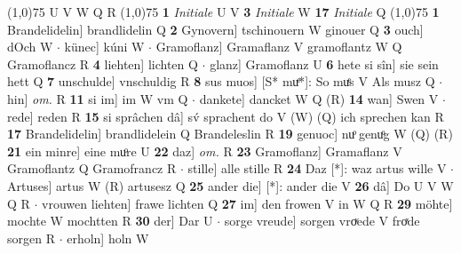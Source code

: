 \documentclass[8pt,a4paper,notitlepage]{article}
\begin{document}
\begin{table}[ht]
\begin{minipage}[t]{0.5\linewidth}
\begin{tabular}{rl}
\end{tabular}
\scriptsize
\line(1,0){75} \newline
U V W Q R \newline
\line(1,0){75} \newline
\textbf{1} \textit{Initiale} U V  \textbf{3} \textit{Initiale} W  \textbf{17} \textit{Initiale} Q  \newline
\line(1,0){75} \newline
\textbf{1} Brandelidelin] brandlidelin Q \textbf{2} Gynovern] tschinouern W ginouer Q \textbf{3} ouch] dOch W  $\cdot$ künec] kúni W  $\cdot$ Gramoflanz] Gramaflanz V gramoflantz W Q Gramoflancz R \textbf{4} liehten] lichten Q  $\cdot$ glanz] Gramoflanz U \textbf{6} hete si sîn] sie sein hett Q \textbf{7} unschulde] vnschuldig R \textbf{8} sus muos] [S* muͤ*]: So muͤs V Als musz Q  $\cdot$ hin] \textit{om.} R \textbf{11} si im] im W vm Q  $\cdot$ dankete] dancket W Q (R) \textbf{14} wan] Swen V  $\cdot$ rede] reden R \textbf{15} si sprâchen dâ] sv́ sprachent do V (W) (Q) ich sprechen kan R \textbf{17} Brandelidelin] brandlidelein Q Brandeleslin R \textbf{19} genuoc] nuͦ genuͦg W (Q) (R) \textbf{21} ein minre] eine muͦre U \textbf{22} daz] \textit{om.} R \textbf{23} Gramoflanz] Gramaflanz V Gramoflantz Q Gramofrancz R  $\cdot$ stille] alle stille R \textbf{24} Daz [*]: waz artus wille V  $\cdot$ Artuses] artus W (R) artusesz Q \textbf{25} ander die] [*]: ander die V \textbf{26} dâ] Do U V W Q R  $\cdot$ vrouwen liehten] frawe lichten Q \textbf{27} im] den frowen V in W Q R \textbf{29} möhte] mochte W mochtten R \textbf{30} der] Dar U  $\cdot$ sorge vreude] sorgen vroͮede V froͯde sorgen R  $\cdot$ erholn] holn W \newline
\end{minipage}
\end{table}
\end{document}

